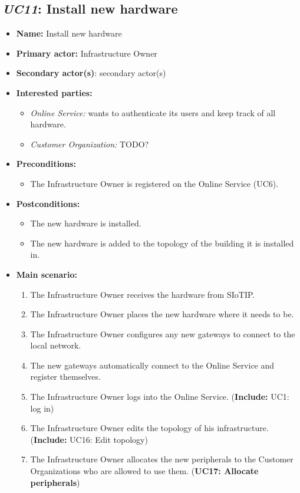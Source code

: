 \documentclass[english,peerreview]{sareport}
\begin{document}
\subsection{\emph{UC11}: Install new hardware}
\begin{itemize}
    \item \textbf{Name:} Install new hardware
    \item \textbf{Primary actor:} Infrastructure Owner
    \item \textbf{Secondary actor(s)}: secondary actor(s)
    \item \textbf{Interested parties:} 
        \begin{itemize}
            \item \textit{Online Service:}  wants to authenticate its users and keep track of all hardware.
            \item \textit{Customer Organization:} TODO?
        \end{itemize}

    \item \textbf{Preconditions:}
        \begin{itemize}
            \item The Infrastructure Owner is registered on the Online Service (UC6).
        \end{itemize}

    \item \textbf{Postconditions:}
        \begin{itemize}
            \item The new hardware is installed.
            \item The new hardware is added to the topology of the building it is installed in.
        \end{itemize}
        
    \item \textbf{Main scenario:} 
    \begin{enumerate}
       \item The Infrastructure Owner receives the hardware from SIoTIP.
       \item The Infrastructure Owner places the new hardware where it needs to be.
       \item The Infrastructure Owner configures any new gateways to connect to the local network.
       \item The new gateways automatically connect to the Online Service and register themselves.
       \item The Infrastructure Owner logs into the Online Service. (\textbf{Include:} UC1: log in)
       \item The Infrastructure Owner edits the topology of his infrastructure. (\textbf{Include:} UC16: Edit topology)
       \item The Infrastructure Owner allocates the new peripherals to the Customer Organizations who are allowed to use them. (\textbf{UC17: Allocate peripherals})
    \end{enumerate}


\end{itemize}
\end{document}
